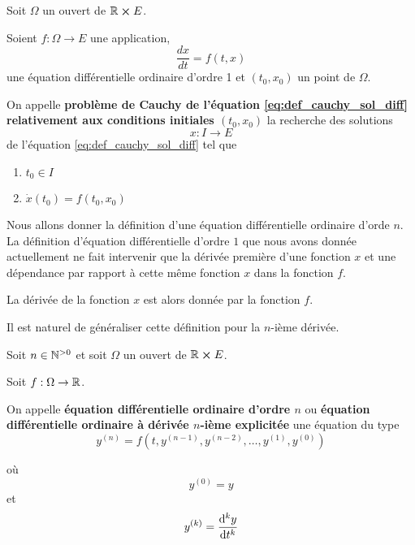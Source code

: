 \documentclass[a4paper, 11pt]{report}
\begin{document}
	\begin{definition} 
		Soit $\Omega$ un ouvert de $\mathbb{R} \cross E$.

		Soient $f : \Omega \rightarrow E$ une application,
		\begin{equation}
			\label{eq:def_cauchy_sol_diff}
			\frac{dx}{dt} = f(t, x)
		\end{equation}
		une équation différentielle ordinaire d'ordre 1 et $(t_{0},
		x_{0})$ un point de $\Omega$.

		On appelle \textbf{problème de Cauchy de l'équation
		\ref{eq:def_cauchy_sol_diff} relativement aux conditions initiales
		$(t_{0}, x_{0})$} la recherche des solutions
		\begin{equation}
			x : I \rightarrow E
		\end{equation}
		de l'équation \ref{eq:def_cauchy_sol_diff} tel que
		\begin{enumerate}
			\item $t_{0} \in I$
			\item $\dot{x}(t_{0}) = f(t_{0}, x_{0})$
		\end{enumerate}
	\end{definition}


	Nous allons donner la définition d'une équation différentielle ordinaire
	d'orde $n$. La définition d'équation différentielle d'ordre $1$ que nous
	avons donnée actuellement ne fait intervenir que la dérivée première d'une
	fonction $x$ et une dépendance par rapport à cette même fonction
	$x$ dans la fonction $f$.

	La dérivée de la fonction $x$ est alors donnée par la fonction
	$f$.

	Il est naturel de généraliser cette définition pour la $n$-ième dérivée.

	\begin{definition} 
		Soit $n \in \mathbb{N}^{> 0}$ et soit $\Omega$ un ouvert de $\mathbb{R}
		\cross E$.

		Soit $f : \Omega \rightarrow \mathbb{R}$.

		On appelle \textbf{équation différentielle ordinaire d'ordre $n$} ou
		\textbf{équation différentielle ordinaire à dérivée $n$-ième explicitée}
		une équation du type
		\begin{equation}
			y^{(n)} = f(t, y^{(n - 1)}, y^{(n - 2)}, \dots, y^{(1)}, y^{(0)})
		\end{equation}

		où
		\begin{equation}
			y^{(0)} = y
		\end{equation}
		et
		\begin{equation}
			y^{(k)} = \dv[k]{y}{t}
		\end{equation}
	\end{definition}
\end{document}
